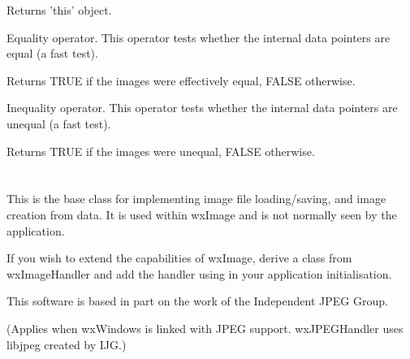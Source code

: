 

Returns 'this' object.



Equality operator. This operator tests whether the internal data pointers are
equal (a fast test).




Returns TRUE if the images were effectively equal, FALSE otherwise.



Inequality operator. This operator tests whether the internal data pointers are
unequal (a fast test).




Returns TRUE if the images were unequal, FALSE otherwise.

\section{}\label{wximagehandler}

This is the base class for implementing image file loading/saving, and image creation from data.
It is used within wxImage and is not normally seen by the application.

If you wish to extend the capabilities of wxImage, derive a class from wxImageHandler
and add the handler using  in your
application initialisation.


This software is based in part on the work of the Independent JPEG Group.

(Applies when wxWindows is linked with JPEG support. wxJPEGHandler uses libjpeg
created by IJG.)



